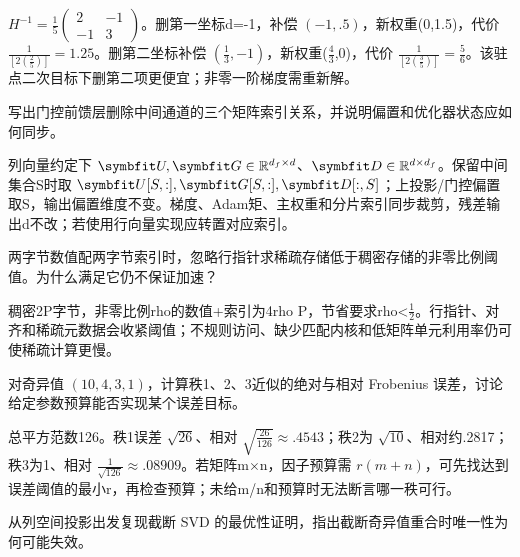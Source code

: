 \begin{exercises}
\begin{exercise}
\begin{solution}
$H^{-1}=\frac15\begin{pmatrix}2&-1\\-1&3\end{pmatrix}$。删第一坐标d=-1，补偿 $(-1,.5)$，新权重(0,1.5)，代价 $\frac{1}{[2(\frac{2}{5})]}=1.25$。删第二坐标补偿 $(\frac{1}{3},-1)$，新权重($\frac{4}{3}$,0)，代价 $\frac{1}{[2(\frac{3}{5})]}=\frac{5}{6}$。该驻点二次目标下删第二项更便宜；非零一阶梯度需重新解。
\end{solution}
\end{exercise}

\begin{exercise} 写出门控前馈层删除中间通道的三个矩阵索引关系，并说明偏置和优化器状态应如何同步。

\begin{solution}
列向量约定下 $\mat{U},\mat{G}\in\mathbb R^{d_f\times d}$、$\mat{D}\in\mathbb R^{d\times d_f}$。保留中间集合S时取 $\mat{U}[S,:],\mat{G}[S,:],\mat{D}[:,S]$；上投影/门控偏置取S，输出偏置维度不变。梯度、Adam矩、主权重和分片索引同步裁剪，残差输出d不改；若使用行向量实现应转置对应索引。
\end{solution}
\end{exercise}

\begin{exercise} 两字节数值配两字节索引时，忽略行指针求稀疏存储低于稠密存储的非零比例阈值。为什么满足它仍不保证加速？

\begin{solution}
稠密2P字节，非零比例rho的数值+索引为4rho P，节省要求rho<$\frac{1}{2}$。行指针、对齐和稀疏元数据会收紧阈值；不规则访问、缺少匹配内核和低矩阵单元利用率仍可使稀疏计算更慢。
\end{solution}
\end{exercise}

\begin{exercise} 对奇异值 $(10,4,3,1)$，计算秩1、2、3近似的绝对与相对 Frobenius 误差，讨论给定参数预算能否实现某个误差目标。

\begin{solution}
总平方范数126。秩1误差 $\sqrt{26}$、相对 $\sqrt{\frac{26}{126}}\approx.4543$；秩2为 $\sqrt{10}$、相对约.2817；秩3为1、相对 $\frac{1}{\sqrt{126}}\approx.08909$。若矩阵m$\times$n，因子预算需 $r(m+n)$，可先找达到误差阈值的最小r，再检查预算；未给m/n和预算时无法断言哪一秩可行。
\end{solution}
\end{exercise}

\begin{exercise}\optional 从列空间投影出发复现截断 SVD 的最优性证明，指出截断奇异值重合时唯一性为何可能失效。


\end{exercise}
\end{exercises}
